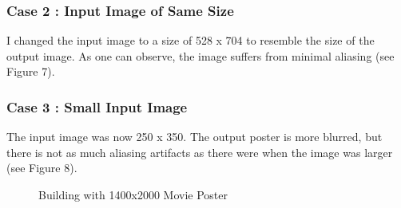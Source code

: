 \documentclass{article}
\newif\ifblackandwhitecycle
\gdef\patternnumber{0}
\gdef\patternnumber{1}
\gdef\patternnumber{1}
\gdef\patternnumber{0}
\gdef\columncount{1}
\gdef\rowcount{1}
\newcommand\zoombox[2][]{
    \begin{scope}[zoombox paths]
        \pgfmathsetmacro\xpos{
            (\columncount-1)*(\imagewidth / \pgfkeysvalueof{/tikz/zoomboxarray columns} + \pgfkeysvalueof{/tikz/zoomboxarray inner gap} / \pgfkeysvalueof{/tikz/zoomboxarray columns} ) + \pgflinewidth
        }
        \pgfmathsetmacro\ypos{
            (\rowcount-1)*( \imageheight / \pgfkeysvalueof{/tikz/zoomboxarray rows} + \pgfkeysvalueof{/tikz/zoomboxarray inner gap} / \pgfkeysvalueof{/tikz/zoomboxarray rows} ) + 0.5*\pgflinewidth
        }
        \edef\dospy{\noexpand\spy [
            #1,
            zoombox paths/.append style={
                black and white pattern=\patternnumber
            },
            every spy on node/.append style={#1},
            x=\imagewidth,
            y=\imageheight
        ] on (#2) in node [anchor=north west] at ($(zoomboxes container.north west)+(\xpos pt,-\ypos pt)$);}
        \dospy
        \pgfmathtruncatemacro\pgfmathresult{ifthenelse(\columncount==\pgfkeysvalueof{/tikz/zoomboxarray columns},\rowcount+1,\rowcount)}
        \global\let\rowcount=\pgfmathresult
        \pgfmathtruncatemacro\pgfmathresult{ifthenelse(\columncount==\pgfkeysvalueof{/tikz/zoomboxarray columns},1,\columncount+1)}
        \global\let\columncount=\pgfmathresult
        \ifblackandwhitecycle
            \pgfmathtruncatemacro{\newpatternnumber}{\patternnumber+1}
            \global\edef\patternnumber{\newpatternnumber}
        \fi
    \end{scope}
}
\begin{document}
\subsubsection{Case 2 : Input Image of Same Size}
I changed the input image to a size of 528 x 704 to resemble the size of the output image.
As one can observe, the image suffers from minimal aliasing (see Figure 7). 

\subsubsection{Case 3 : Small Input Image}
The input image was now 250 x 350. The output poster is more blurred, but there is not as much aliasing 
artifacts as there were when the image was larger (see Figure 8).

\begin{figure}[H]\centering
    \caption{Building with 1400x2000 Movie Poster}
    \end{figure}
\end{document}
